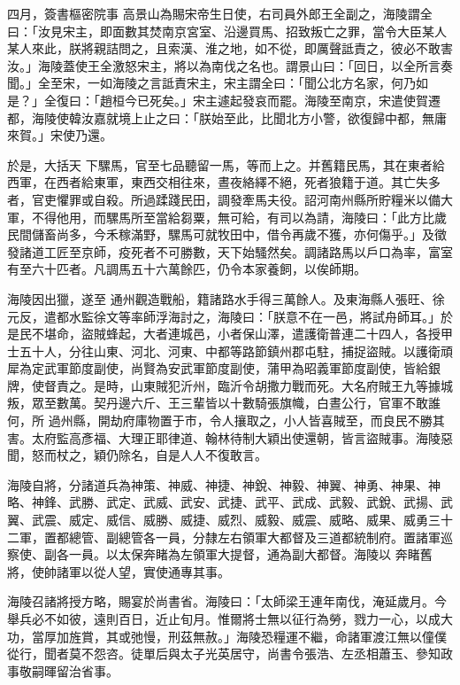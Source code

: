 \begin{pinyinscope}
 四月，簽書樞密院事
 高景山為賜宋帝生日使，右司員外郎王全副之，海陵謂全曰：「汝見宋主，即面數其焚南京宮室、沿邊買馬、招致叛亡之罪，當令大臣某人某人來此，朕將親詰問之，且索漢、淮之地，如不從，即厲聲詆責之，彼必不敢害汝。」海陵蓋使王全激怒宋主，將以為南伐之名也。謂景山曰：「回日，以全所言奏聞。」全至宋，一如海陵之言詆責宋主，宋主謂全曰：「聞公北方名家，何乃如是？」全復曰：「趙桓今已死矣。」宋主遽起發哀而罷。海陵至南京，宋遣使賀遷都，海陵使韓汝嘉就境上止之曰：「朕始至此，比聞北方小警，欲復歸中都，無庸來賀。」宋使乃還。



 於是，大括天
 下騾馬，官至七品聽留一馬，等而上之。并舊籍民馬，其在東者給西軍，在西者給東軍，東西交相往來，晝夜絡繹不絕，死者狼籍于道。其亡失多者，官吏懼罪或自殺。所過蹂踐民田，調發牽馬夫役。詔河南州縣所貯糧米以備大軍，不得他用，而騾馬所至當給芻粟，無可給，有司以為請，海陵曰：「此方比歲民間儲畜尚多，今禾稼滿野，騾馬可就牧田中，借令再歲不獲，亦何傷乎。」及徵發諸道工匠至京師，疫死者不可勝數，天下始騷然矣。調諸路馬以戶口為率，富室有至六十匹者。凡調馬五十六萬餘匹，仍令本家養飼，以俟師期。



 海陵因出獵，遂至
 通州觀造戰船，籍諸路水手得三萬餘人。及東海縣人張旺、徐元反，遣都水監徐文等率師浮海討之，海陵曰：「朕意不在一邑，將試舟師耳。」於是民不堪命，盜賊蜂起，大者連城邑，小者保山澤，遣護衛普連二十四人，各授甲士五十人，分往山東、河北、河東、中都等路節鎮州郡屯駐，捕捉盜賊。以護衛頑犀為定武軍節度副使，尚賢為安武軍節度副使，蒲甲為昭義軍節度副使，皆給銀牌，使督責之。是時，山東賊犯沂州，臨沂令胡撒力戰而死。大名府賊王九等據城叛，眾至數萬。契丹邊六斤、王三輩皆以十數騎張旗幟，白晝公行，官軍不敢誰何，所
 過州縣，開劫府庫物置于市，令人攘取之，小人皆喜賊至，而良民不勝其害。太府監高彥福、大理正耶律道、翰林待制大穎出使還朝，皆言盜賊事。海陵惡聞，怒而杖之，穎仍除名，自是人人不復敢言。



 海陵自將，分諸道兵為神策、神威、神捷、神銳、神毅、神翼、神勇、神果、神略、神鋒、武勝、武定、武威、武安、武捷、武平、武成、武毅、武銳、武揚、武翼、武震、威定、威信、威勝、威捷、威烈、威毅、威震、威略、威果、威勇三十二軍，置都總管、副總管各一員，分隸左右領軍大都督及三道都統制府。置諸軍巡察使、副各一員。以太保奔睹為左領軍大提督，通為副大都督。海陵以
 奔睹舊將，使帥諸軍以從人望，實使通專其事。



 海陵召諸將授方略，賜宴於尚書省。海陵曰：「太師梁王連年南伐，淹延歲月。今舉兵必不如彼，遠則百日，近止旬月。惟爾將士無以征行為勞，戮力一心，以成大功，當厚加旌賞，其或弛慢，刑茲無赦。」海陵恐糧運不繼，命諸軍渡江無以僮僕從行，聞者莫不怨咨。徒單后與太子光英居守，尚書令張浩、左丞相蕭玉、參知政事敬嗣暉留治省事。




\end{pinyinscope}
